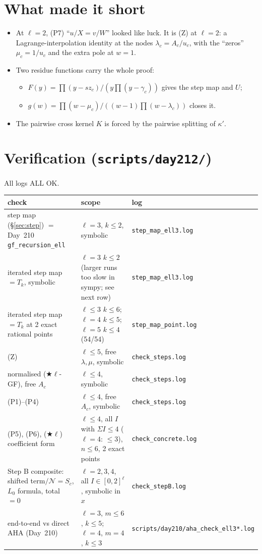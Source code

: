 \documentclass[11pt]{amsart}
\theoremstyle{remark}
\newcommand{\cN}{\mathcal{N}}
\newcommand{\starl}{($\bigstar\ell$)}
\begin{document}
\section{What made it short}\label{sec:short}
\begin{itemize}
\item At $\ell=2$, (P7) ``$u/X=v/W$'' looked like luck. It is (Z) at $\ell=2$: a Lagrange-interpolation identity at the nodes $\lambda_c=A_c/u_c$, with the ``zeros'' $\mu_c=1/u_c$ and the extra pole at $w=1$.
\item Two residue functions carry the whole proof:
\begin{itemize}
\item $F(y)=\prod(y-sz_c)/(y\prod(y-\gamma_c))$ gives the step map and $U$;
\item $g(w)=\prod(w-\mu_c)/((w-1)\prod(w-\lambda_c))$ closes it.
\end{itemize}
\item The pairwise cross kernel $K$ is forced by the pairwise splitting of $\kappa'$.
\end{itemize}

\section{Verification (\texttt{scripts/day212/})}\label{sec:verif}

All logs ALL OK.

\begin{center}
\footnotesize
\begin{tabular}{@{}p{}p{}p{}@{}}
\toprule
check & scope & log\\
\midrule
step map (\S\ref{sec:step}) $=$ Day~210 \texttt{gf\_recursion\_ell} & $\ell=3$, $k\le2$, symbolic & \texttt{step\_map\_ell3.log}\\
iterated step map $=T_k$, symbolic & $\ell=3$ $k\le2$ (larger runs too slow in sympy; see next row) & \texttt{step\_map\_ell3.log}\\
iterated step map $=T_k$ at 2 exact rational points & $\ell\le3$ $k\le6$; $\ell=4$ $k\le5$; $\ell=5$ $k\le4$ (54/54) & \texttt{step\_map\_point.log}\\
(Z) & $\ell\le5$, free $\lambda,\mu$, symbolic & \texttt{check\_steps.log}\\
normalised ($\bigstar\ell$-GF), free $A_c$ & $\ell\le4$, symbolic & \texttt{check\_steps.log}\\
(P1)--(P4) & $\ell\le4$, free $A_c$, symbolic & \texttt{check\_steps.log}\\
(P5), (P6), \starl{} coefficient form & $\ell\le4$, all $I$ with $\Sigma I\le4$ ($\ell=4$: $\le3$), $n\le6$, 2 exact points & \texttt{check\_concrete.log}\\
Step B composite: shifted term$/\cN=S_c$, $L_0$ formula, total $=0$ & $\ell=2,3,4$, all $I\in[0,2]^\ell$, symbolic in $x$ & \texttt{check\_stepB.log}\\
end-to-end vs direct AHA (Day~210) & $\ell=3$, $m\le6$, $k\le5$; $\ell=4$, $m=4$, $k\le3$ & \texttt{scripts/day210/}\allowbreak\texttt{aha\_check\_ell3*.log}\\
\bottomrule
\end{tabular}
\end{center}
\end{document}
